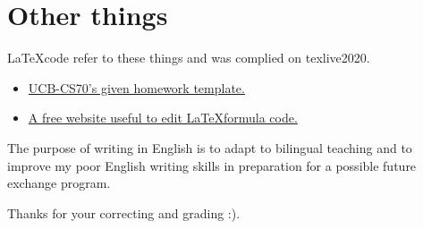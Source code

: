 \documentclass[11pt]{article}  %
\begin{document}
\section*{Other things}

\LaTeX \space code refer to these things and was complied on texlive2020.
\begin{itemize}
    \item  \href{https://www.eecs70.org/assets/misc/homework_template.tex}{UCB-CS70's given homework template.} 
    \item  \href{https://www.latexlive.com}{A free website useful to edit \LaTeX \space formula code.}
\end{itemize}

The purpose of writing in English is to adapt to bilingual teaching and to improve my poor English 
writing skills in preparation for a possible future exchange program. 

Thanks for your correcting and grading :).
\end{document}
